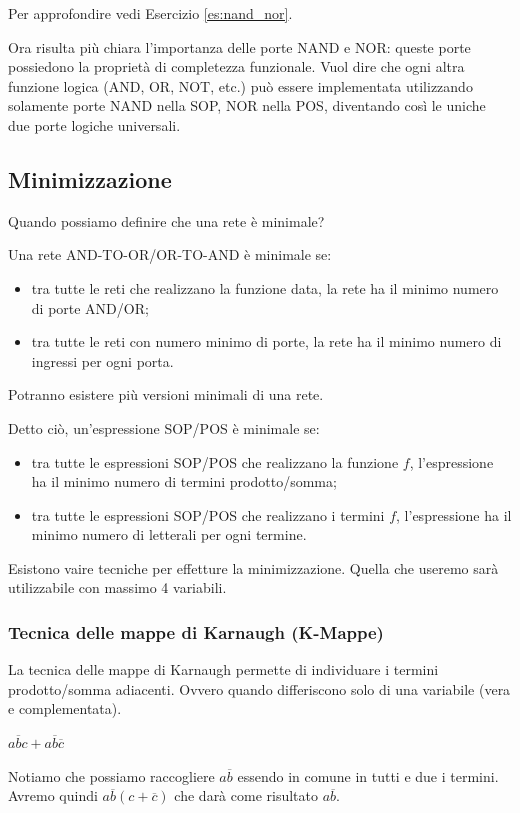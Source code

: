 Per approfondire vedi Esercizio \ref{es:nand_nor}.

Ora risulta più chiara l'importanza delle porte NAND e NOR: queste porte possiedono la proprietà di completezza funzionale. 
Vuol dire che ogni altra funzione logica (AND, OR, NOT, etc.) può essere implementata utilizzando solamente porte NAND nella SOP, NOR nella POS, diventando così le uniche due porte logiche universali.


\subsection{Minimizzazione}
Quando possiamo definire che una rete è minimale?

Una rete AND-TO-OR/OR-TO-AND è minimale se:
\begin{itemize}
    \item tra tutte le reti che realizzano la funzione data, la rete ha il minimo numero di porte AND/OR;
    \item tra tutte le reti con numero minimo di porte, la rete ha il minimo numero di ingressi per ogni porta.
\end{itemize}
\begin{osservation}
    Potranno esistere più versioni minimali di una rete.
\end{osservation}
Detto ciò, un'espressione SOP/POS è minimale se:
\begin{itemize}
    \item tra tutte le espressioni SOP/POS che realizzano la funzione $f$, l'espressione ha il minimo numero di termini prodotto/somma;
    \item tra tutte le espressioni SOP/POS che realizzano i termini $f$, l'espressione ha il minimo numero di letterali per ogni termine.
\end{itemize}
Esistono vaire tecniche per effetture la minimizzazione. Quella che useremo sarà utilizzabile con massimo 4 variabili.

\subsubsection*{Tecnica delle mappe di Karnaugh (K-Mappe)}
La tecnica delle mappe di Karnaugh permette di individuare i termini prodotto/somma adiacenti. Ovvero quando differiscono solo di una variabile (vera e complementata).
\begin{example}
    $a\overline{b}c+a\overline{b}\overline{c}$
    
    Notiamo che possiamo raccogliere $a\overline{b}$ essendo in comune in tutti e due i termini. Avremo quindi $a\overline{b}(c+\overline{c})$ che darà come risultato $a\overline{b}$.
\end{example}

